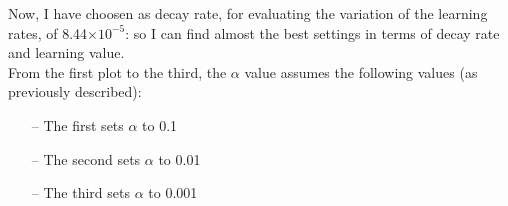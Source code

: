 \documentclass{article}
\begin{document}
Now, I have choosen as decay rate, for evaluating the variation of the learning rates, of 8.44$\times10^{-5}$: so I can find almost the best settings in terms of decay rate and learning value.
\\
From the first plot to the third, the $\alpha$ value assumes the following values (as previously described):
\begin{itemize}
\item[--] The first sets $\alpha$ to 0.1
\item[--] The second sets $\alpha$ to 0.01
\item[--] The third sets $\alpha$ to 0.001
\end{itemize}

\clearpage


\begin{center}
\centering
{}
\end{center}

\begin{center}
\centering
{}
\end{center}

\begin{center}
\centering
{}
\end{center}
\end{document}
